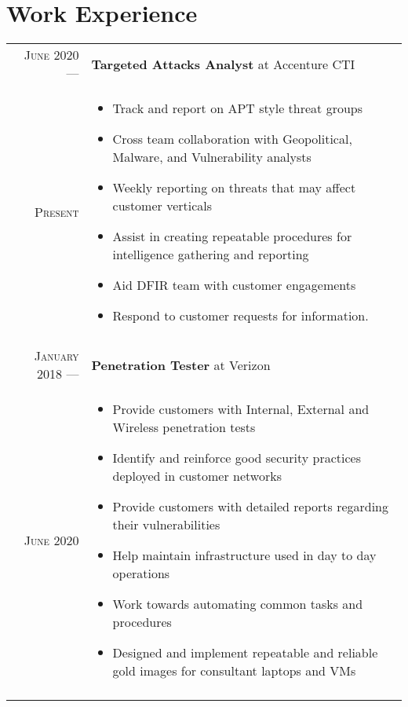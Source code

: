 \documentclass[a4paper,10pt]{article}
\begin{document}
\section{Work Experience}
\begin{tabular}{r|p{11cm}}

 \textsc{June 2020} ---            & \textbf {Targeted Attacks Analyst} at Accenture CTI \\
 \textsc{Present} \hphantom{---} & \footnotesize{
        \vspace{-2mm}
        \begin{itemize}[leftmargin=*]
            \item Track and report on APT style threat groups
            \item Cross team collaboration with Geopolitical, Malware, and Vulnerability analysts 
            \item Weekly reporting on threats that may affect customer verticals
            \item Assist in creating repeatable procedures for intelligence gathering and reporting
            \item Aid DFIR team with customer engagements
            \item Respond to customer requests for information. 
        \end{itemize}
        \vspace*{-\baselineskip}
    }\\
 \multicolumn{2}{c}{} \\

 \textsc{January 2018} ---            & \textbf {Penetration Tester} at Verizon \\
 \textsc{June 2020} \hphantom{---} & \footnotesize{
        \vspace{-2mm}
        \begin{itemize}[leftmargin=*]
            \item Provide customers with Internal, External and Wireless penetration tests
            \item Identify and reinforce good security practices deployed in customer networks
            \item Provide customers with detailed reports regarding their vulnerabilities
            \item Help maintain infrastructure used in day to day operations
            \item Work towards automating common tasks and procedures
            \item Designed and implement repeatable and reliable gold images for consultant laptops and VMs
        \end{itemize}
        \vspace*{-\baselineskip}
    }\\
 \multicolumn{2}{c}{} \\


\end{tabular}
\end{document}
